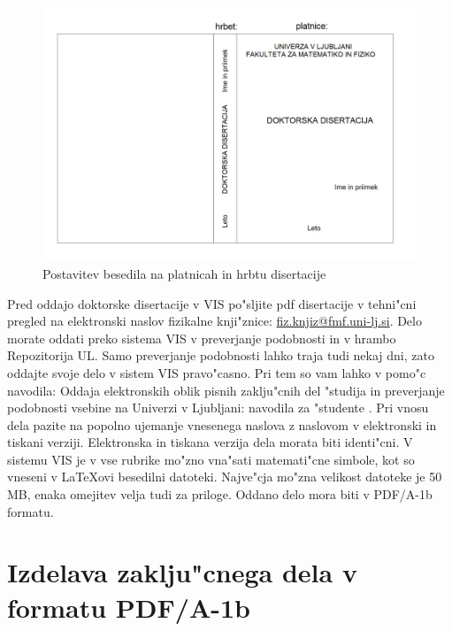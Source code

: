 \begin{figure}[h]
\begin{center}
\includegraphics[width=15cm]{Platnicedoktorat}
\end{center}
\caption[Platnice]{Postavitev besedila na platnicah in hrbtu disertacije}
\label{pic2}
\end{figure}

Pred oddajo doktorske disertacije v VIS po"sljite pdf disertacije v tehni"cni pregled na elektronski naslov fizikalne knji"znice: \href{mailto:fiz.knjiz@fmf.uni-lj.si}{fiz.knjiz@fmf.uni-lj.si}.
Delo morate oddati preko sistema \acs{VIS} v preverjanje podobnosti in v hrambo Repozitorija \acs{UL}. 
Samo preverjanje podobnosti lahko traja tudi nekaj dni, zato oddajte svoje delo v sistem \acs{VIS} pravo"casno.  
Pri tem so vam lahko v pomo"c navodila: Oddaja elektronskih oblik pisnih zaklju"cnih del "studija in preverjanje podobnosti vsebine na Univerzi v Ljubljani: navodila za "studente \cite{Oddaja}. 
Pri vnosu dela pazite na popolno ujemanje vnesenega naslova z naslovom v elektronski in tiskani verziji. 
Elektronska in tiskana verzija dela morata biti identi"cni. 
V sistemu \acs{VIS} je v vse rubrike mo"zno vna"sati matemati"cne simbole, kot so vneseni v \LaTeX{ovi} besedilni datoteki.
Najve"cja mo"zna velikost datoteke je 50 MB, enaka omejitev velja tudi za priloge. Oddano delo mora biti v PDF/A-1b formatu. 

\section{Izdelava zaklju"cnega dela v formatu PDF/A-1b}


